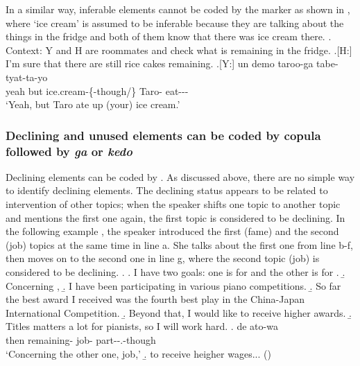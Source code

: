 In a similar way,
inferable elements cannot be coded by the marker
as shown in \Next,
where `ice cream' is assumed to be inferable because they are talking about the things in the fridge and both of them know that there was ice cream there.
%
\ex. Context:
	Y and H are roommates and check what is remaining in the fridge.
	\a.[H:] I'm sure that there are still rice cakes remaining.
	\bg.[Y:] un demo  taroo-ga tabe-tyat-ta-yo \\
		yeah but ice.cream-\{-though/\} Taro- eat--- \\
		`Yeah, but Taro ate up (your) ice cream.'


\subsubsection{Declining and unused elements can be coded by copula followed by \textit{ga} or \textit{kedo}}

Declining elements can be coded by .
As discussed above,
there are no simple way to identify declining elements.
The declining status appears to be related to intervention of other topics;
when the speaker shifts one topic to another topic and mentions the first one again,
the first topic is considered to be declining.
In the following example \Next,
the speaker introduced the first (fame) and the second (job) topics at the same time in line a.
She talks about the first one from line b-f,
then moves on to the second one in line g,
where the second topic (job) is considered to be declining.
%
\ex.\label{sigoto2}
 \a. I have two goals: one is for  and the other is for .
 \b. Concerning ,
 \b. I have been participating in various piano competitions.
 \b. So far the best award I received was the fourth best play in the China-Japan International Competition.
 \b. Beyond that, I would like to receive higher awards.
 \b. Titles matters a lot for pianists, so I will work hard.
 \bg. de ato-wa   \\
 	then remaining- job- part--.-though \\
	`Concerning the other one, job,'
 \b. to receive heigher wages...
\hfill{()}
%

